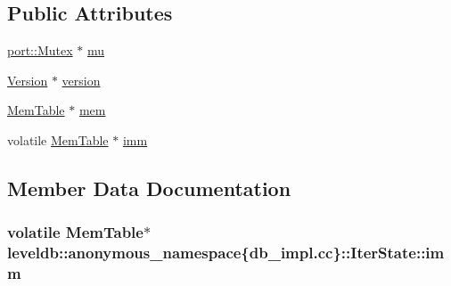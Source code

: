 \subsection*{Public Attributes}
\begin{DoxyCompactItemize}
\item 
\hyperlink{classleveldb_1_1port_1_1_mutex}{port\+::\+Mutex} $\ast$ \hyperlink{structleveldb_1_1anonymous__namespace_02db__impl_8cc_03_1_1_iter_state_a8f6fc009b08eabb816a85bfaa510c90d}{mu}
\item 
\hyperlink{classleveldb_1_1_version}{Version} $\ast$ \hyperlink{structleveldb_1_1anonymous__namespace_02db__impl_8cc_03_1_1_iter_state_a5a171845ecad140877b86930306c84b6}{version}
\item 
\hyperlink{classleveldb_1_1_mem_table}{Mem\+Table} $\ast$ \hyperlink{structleveldb_1_1anonymous__namespace_02db__impl_8cc_03_1_1_iter_state_aa6a99476de94976aa80eb4b0d82cd0f5}{mem}
\item 
volatile \hyperlink{classleveldb_1_1_mem_table}{Mem\+Table} $\ast$ \hyperlink{structleveldb_1_1anonymous__namespace_02db__impl_8cc_03_1_1_iter_state_ae3ac601c1d11f0871341e03c4c46f1e6}{imm}
\end{DoxyCompactItemize}


\subsection{Member Data Documentation}
\hypertarget{structleveldb_1_1anonymous__namespace_02db__impl_8cc_03_1_1_iter_state_ae3ac601c1d11f0871341e03c4c46f1e6}{}
\subsubsection[{imm}]{\setlength{\rightskip}{0pt plus 5cm}volatile {\bf Mem\+Table}$\ast$ leveldb\+::anonymous\+\_\+namespace\{db\+\_\+impl.\+cc\}\+::Iter\+State\+::imm}\label{structleveldb_1_1anonymous__namespace_02db__impl_8cc_03_1_1_iter_state_ae3ac601c1d11f0871341e03c4c46f1e6}
\hypertarget{structleveldb_1_1anonymous__namespace_02db__impl_8cc_03_1_1_iter_state_aa6a99476de94976aa80eb4b0d82cd0f5}{}
